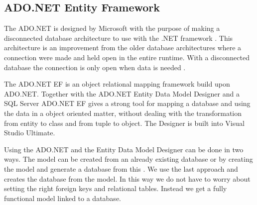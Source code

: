 \subsection{ADO.NET Entity Framework}
\label{sub:adonet}
The ADO.NET is designed by Microsoft with the purpose of making a disconnected database architecture to use with the .NET framework \cite{adonetDesignGoal}. 
This architecture is an improvement from the older database architectures where a connection were made and held open in the entire runtime. With a disconnected database the connection is only open when data is needed \cite{disconnectedData}. 

The ADO.NET EF is an object relational mapping framework \cite{adonetEntityFramework} build upon ADO.NET. 
Together with the ADO.NET Entity Data Model Designer and a SQL Server ADO.NET EF gives a strong tool for mapping a database and using the data in a object oriented matter, without dealing with the transformation from entity to class and from tuple to object. 
The Designer is built into Visual Studio Ultimate. 

Using the ADO.NET and the Entity Data Model Designer can be done in two ways. 
The  model can be created from an already existing database or by creating the model and generate a database from this \cite{adonetEntityDataModelDesigner}.
We use the last approach and creates the database from the model. 
In this way we do not have to worry about setting the right foreign keys and relational tables. Instead we get a fully functional model linked to a database. 

